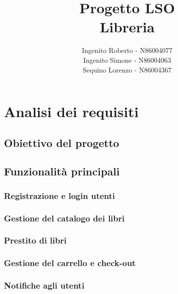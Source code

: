 \documentclass[]{report}
\title{\textbf{Progetto LSO}\\Libreria}
\author{
    Ingenito Roberto - N86004077\\
    Ingenito Simone - N86004063\\
    Sequino Lorenzo - N86004367 
   }
\date{}
\begin{document}
\maketitle

\newpage

\tableofcontents

\newpage



\newpage
\chapter{Analisi dei requisiti}
\section{Obiettivo del progetto}
\section{Funzionalità principali}
\subsection{Registrazione e login utenti}
\subsection{Gestione del catalogo dei libri}
\subsection{Prestito di libri}
\subsection{Gestione del carrello e check-out}
\subsection{Notifiche agli utenti}
\end{document}
